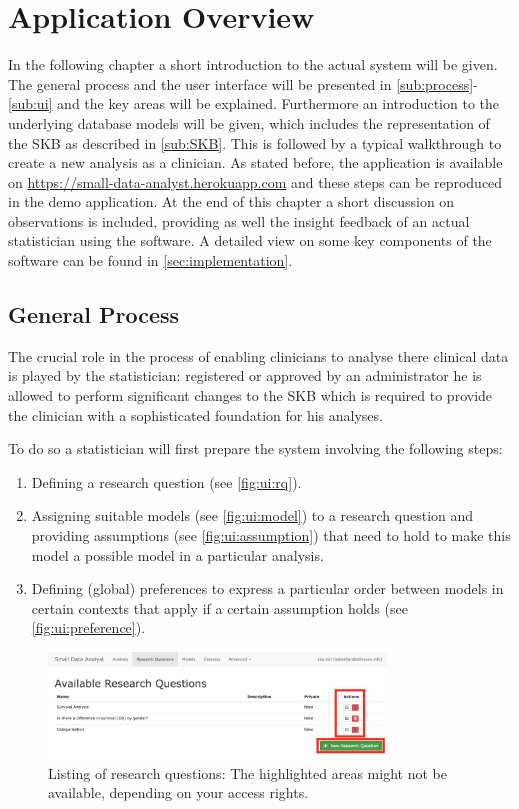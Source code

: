 \section{Application Overview}
In the following chapter a short introduction to the actual system will be given. The general process and the user interface will be presented in \autoref{sub:process}-\ref{sub:ui} and the key areas will be explained. Furthermore an introduction to the underlying database models will be given, which includes the representation of the \gls{SKB} as described in \autoref{sub:SKB}. This is followed by a typical walkthrough to create a new analysis as a clinician. As stated before, the application is available on \href{https://small-data-analyst.herokuapp.com}{https://small-data-analyst.herokuapp.com} and these steps can be reproduced in the demo application. At the end of this chapter a short discussion on observations is included, providing as well the insight feedback of an actual statistician using the software. A detailed view on some key components of the software can be found in \autoref{sec:implementation}.

\subsection{General Process}
\label{sub:process}
The crucial role in the process of enabling clinicians to analyse there clinical data is played by the statistician: registered or approved by an administrator he is allowed to perform significant changes to the \gls{SKB} which is required to provide the clinician with a sophisticated foundation for his analyses. 

To do so a statistician will first prepare the system involving the following steps:


\begin{enumerate}
	\item Defining a research question (see \autoref{fig:ui:rq}).
	\item Assigning suitable models (see \autoref{fig:ui:model}) to a research question and providing assumptions (see \autoref{fig:ui:assumption}) that need to hold to make this model a possible model in a particular analysis.
	\item Defining (global) preferences to express a particular order between models in certain contexts that apply if a certain assumption holds (see \autoref{fig:ui:preference}).
\end{enumerate}

\begin{figure}[h]
\centering
\includegraphics[width=0.8\textwidth]{figures/ui_RQ}
\caption{Listing of research questions: The highlighted areas might not be available, depending on your access rights.}
\label{fig:ui:rq}
\end{figure}


